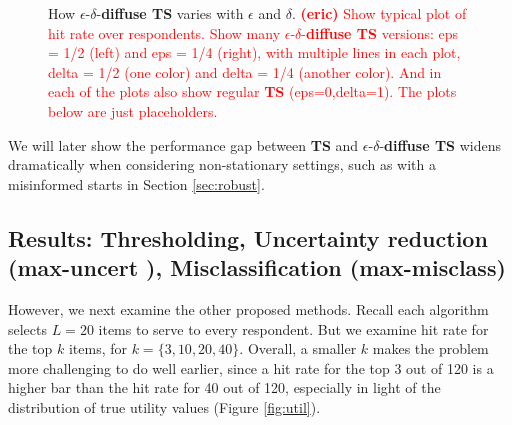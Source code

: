 \documentclass[nonblindrev]{informs3}
\newcommand{\eric}[1]{\textcolor{red}{\textbf{(eric)} #1}}
\newcommand{\mismin}{\textbf{max-misclass}}
\newcommand{\ts}{\textbf{TS} }
\newcommand{\edts}{$\epsilon$-$\delta$-\textbf{diffuse TS} }
\newcommand{\uncert}{\textbf{max-uncert} }
\begin{document}
\begin{figure}
\caption{How \edts varies with $\epsilon$ and $\delta$. \eric{Show typical plot of hit rate over respondents. Show many \edts versions: eps = 1/2 (left) and eps = 1/4 (right), with multiple lines in each plot, delta = 1/2 (one color) and delta = 1/4 (another color). And in each of the plots also show regular \ts (eps=0,delta=1). The plots below are just placeholders.} }
\label{fig:effects_epsilon_delta}
 	\begin{center}
    \qquad
    \end{center}
\end{figure}


We will later show the performance gap between \ts and \edts widens dramatically when considering non-stationary settings, such as with a misinformed starts in Section \ref{sec:robust}. 


\subsection{Results: Thresholding, Uncertainty reduction (\uncert), Misclassification (\mismin) }

However, we next examine the other proposed methods. Recall each algorithm selects $L=20$ items to serve to every respondent. But we examine hit rate for the top $k$ items, for $k = \{3,10,20,40\}$. Overall, a smaller $k$ makes the problem more challenging to do well earlier, since a hit rate for the top 3 out of 120 is a higher bar than the hit rate for 40 out of 120, especially in light of the distribution of true utility values (Figure \ref{fig:util}).  
\end{document}
